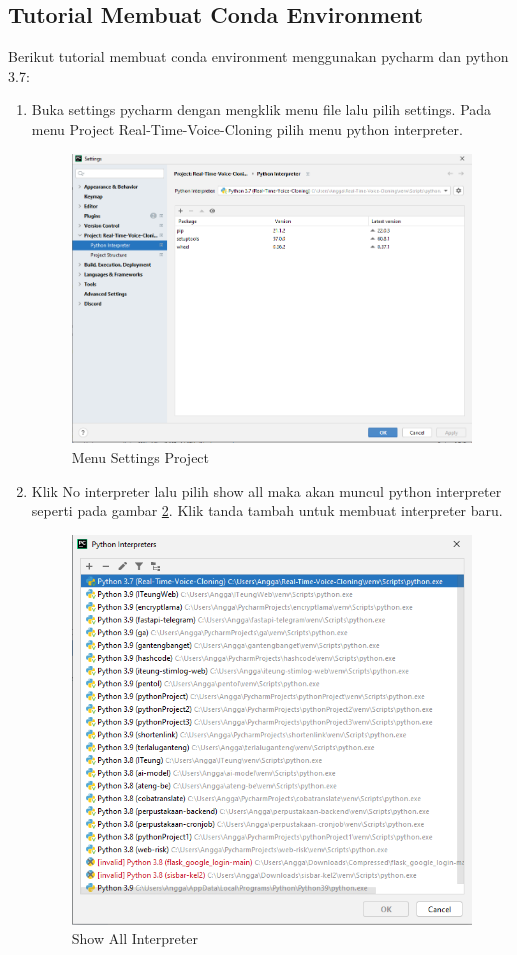 \subsection{Tutorial Membuat Conda Environment}
Berikut tutorial membuat conda environment menggunakan pycharm dan python 3.7:
\begin{enumerate}

\item Buka settings pycharm dengan mengklik menu file lalu pilih settings. Pada menu Project Real-Time-Voice-Cloning pilih menu python interpreter.
\begin{figure}[H]
\centering
\includegraphics[scale=.4]{figures/cenv1}
\caption{Menu Settings Project}
\label{cenv1}
\end{figure}

\item Klik No interpreter lalu pilih show all maka akan muncul python interpreter seperti pada gambar \ref{cenv2}. Klik tanda tambah untuk membuat interpreter baru.
\begin{figure}[H]
\centering
\includegraphics[scale=.4]{figures/cenv2}
\caption{Show All Interpreter}
\label{cenv2}
\end{figure}


\end{enumerate}
